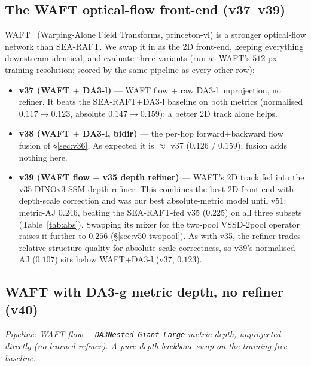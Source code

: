 \documentclass[11pt,a4paper]{article}
\begin{document}
\subsection{The WAFT optical-flow front-end (v37--v39)}
\label{sec:waft}
WAFT~\cite{waft} (Warping-Alone Field Transforms, princeton-vl) is a stronger optical-flow
network than SEA-RAFT. We swap it in as the 2D front-end, keeping everything downstream identical,
and evaluate three variants (run at WAFT's $512$-px training resolution; scored by the same
pipeline as every other row):
\begin{itemize}
  \item \textbf{v37 (WAFT $+$ DA3-l)} --- WAFT flow $+$ raw DA3-l unprojection, no refiner. It beats the
    SEA-RAFT$+$DA3-l baseline on both metrics (normalised $0.117\!\to\!0.123$, absolute
    $0.147\!\to\!0.159$): a better 2D track alone helps.
  \item \textbf{v38 (WAFT $+$ DA3-l, bidir)} --- the per-hop forward$+$backward flow fusion of
    \S\ref{sec:v36}. As expected it is $\approx$ v37 ($0.126$ / $0.159$); fusion adds nothing here.
  \item \textbf{v39 (WAFT flow $+$ v35 depth refiner)} --- WAFT's 2D track fed into the v35
    DINOv3-SSM depth refiner. This combines the best 2D front-end with depth-scale correction and
    was our best absolute-metric model until v51: metric-AJ $0.246$, beating the SEA-RAFT-fed v35
    ($0.225$) on all three subsets (Table~\ref{tab:abs}). Swapping its mixer for the two-pool
    VSSD-2pool operator raises it further to $0.256$ (\S\ref{sec:v50-twopool}).
    As with v35, the refiner trades
    relative-structure quality for absolute-scale correctness, so v39's normalised AJ ($0.107$) sits
    below WAFT$+$DA3-l (v37, $0.123$).
\end{itemize}

\subsection{WAFT with DA3-g metric depth, no refiner (v40)}
\label{sec:v40}
\emph{Pipeline: WAFT flow $+$ \texttt{DA3Nested-Giant-Large} metric depth, unprojected directly (no
learned refiner). A pure depth-backbone swap on the training-free baseline.}
\end{document}
